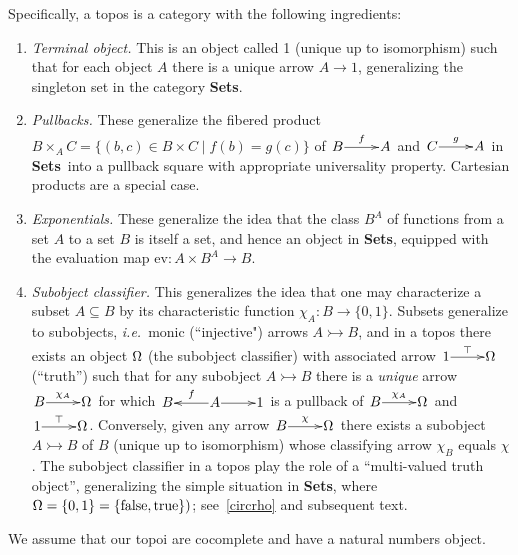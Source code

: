 \documentclass[11pt]{article}
\newcommand{\Sets}{\mbox{\textbf{Sets}}}
\newcommand{\raw}{\rightarrow} \newcommand{\rat}{\mapsto}
\newcommand{\x}{\times} \newcommand{\hb}{\hbar}
\newcommand{\er}{\eqref}
\newcommand{\ch}{\chi} \newcommand{\ps}{\psi} \newcommand{\Ps}{\Psi}
\newcommand{\ie}{\textit{i.e.}}
\begin{document}
Specifically,
a topos is a category with the following ingredients:
\begin{enumerate}
\item {\it Terminal object.} This is an object called 1 (unique up to
  isomorphism) such that for each object $A$ there is a unique arrow
  $A\raw 1$, generalizing the singleton set in the category \Sets.
\item {\it Pullbacks.} These generalize the fibered product $B\x_A
  C=\{(b,c)\in B\x C\mid f(b)=g(c)\}$  of $\xymatrix@1{B\ar^-{f}[r]&A}$ and
  $\xymatrix@1{C\ar^-{g}[r]&A}$ in \Sets\ into a pullback square with
  appropriate universality property.  Cartesian products are a special
  case.
\item {\it Exponentials.} These generalize the idea that the class
  $B^A$ of functions from a set $A$ to a set $B$ is itself a set, and
  hence an object in \Sets, equipped with the evaluation map
  $\mathrm{ev}:A\x B^A\raw B$.
\item {\it Subobject classifier.} This generalizes the idea that one
  may characterize a subset $A\subseteq B$ by its characteristic
  function $\ch_A:B\raw \{0,1\}$. Subsets generalize to subobjects,
  \ie\ monic (``injective") arrows $A \rightarrowtail B$, and in a
  topos there exists an object $\Omega$ (the subobject classifier) with
  associated arrow $\xymatrix@1{1\ar^-{\top}[r]&\Om}$ (``truth'') such
  that for any subobject $A \rightarrowtail B$ there is a {\it unique}
  arrow $\xymatrix@1{B\ar^-{\chi_A}[r]&\Om}$ for which
  $\xymatrix@1{B&A\ar_-{f}[l]\ar[r]&1}$ is a pullback of
  $\xymatrix@1{B\ar^-{\chi_A}[r]&\Om}$ and
  $\xymatrix@1{1\ar^-{\top}[r]&\Omega}$. Conversely, given any arrow
  $\xymatrix@1{B\ar^-{\ch}[r]&\Om}$ there exists a subobject $A
  \rightarrowtail B$
  of $B$ (unique up to isomorphism) whose classifying arrow $\ch_B$
  equals $\ch$. The subobject classifier in a topos play the role of a
  ``multi-valued truth object'', generalizing the simple situation in
  \Sets, where  $\Omega=\{0,1\}=\{\mathrm{false, true}\})$;
  see~\er{circrho} and subsequent text.
\end{enumerate}

We assume that our topoi are cocomplete and have a natural numbers object.
\end{document}
